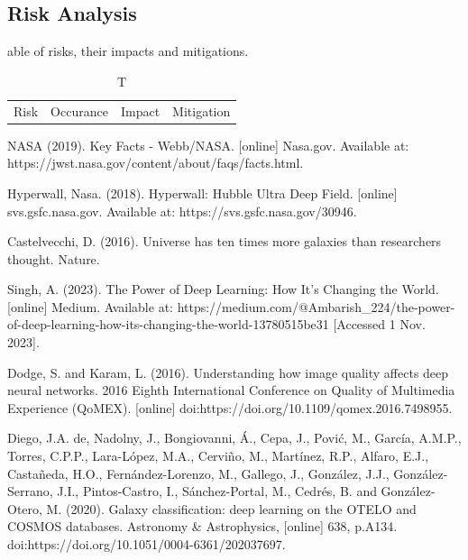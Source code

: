 \documentclass[runningheads]{llncs}
\begin{document}
\subsection{Risk Analysis}

\begin{table}
    \caption Table of risks, their impacts and mitigations.
    \begin{tabular}{|l|l|l|l|}
        \hline
        Risk & Occurance & Impact & Mitigation
        \hline


    \end{tabular}
\end{table}

\begin{thebibliography}{8}

NASA (2019). Key Facts - Webb/NASA. [online] Nasa.gov. Available at: https://jwst.nasa.gov/content/about/faqs/facts.html.

Hyperwall, Nasa. (2018). Hyperwall: Hubble Ultra Deep Field. [online] svs.gsfc.nasa.gov. Available at: https://svs.gsfc.nasa.gov/30946.

Castelvecchi, D. (2016). Universe has ten times more galaxies than researchers thought. Nature. 

Singh, A. (2023). The Power of Deep Learning: How It's Changing the World. [online] Medium. Available at: https://medium.com/@Ambarish_224/the-power-of-deep-learning-how-its-changing-the-world-13780515be31 [Accessed 1 Nov. 2023].

Dodge, S. and Karam, L. (2016). Understanding how image quality affects deep neural networks. 2016 Eighth International Conference on Quality of Multimedia Experience (QoMEX). [online] doi:https://doi.org/10.1109/qomex.2016.7498955.

Diego, J.A. de, Nadolny, J., Bongiovanni, Á., Cepa, J., Pović, M., García, A.M.P., Torres, C.P.P., Lara-López, M.A., Cerviño, M., Martínez, R.P., Alfaro, E.J., Castañeda, H.O., Fernández-Lorenzo, M., Gallego, J., González, J.J., González-Serrano, J.I., Pintos-Castro, I., Sánchez-Portal, M., Cedrés, B. and González-Otero, M. (2020). Galaxy classification: deep learning on the OTELO and COSMOS databases. Astronomy \& Astrophysics, [online] 638, p.A134. doi:https://doi.org/10.1051/0004-6361/202037697.

\end{thebibliography}
\end{document}
